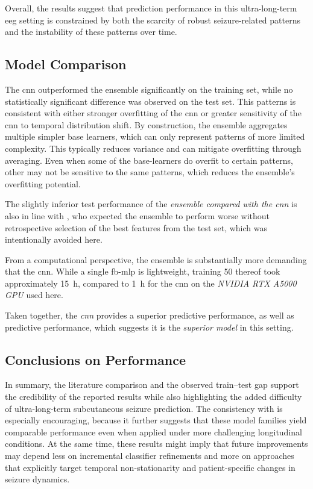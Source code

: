 Overall, the results suggest that prediction performance in this ultra-long-term \gls{eeg} setting is constrained by both the scarcity of robust seizure-related patterns and the instability of these patterns over time.

\subsection{Model Comparison}\label{subsec:discussion-model-comparison}
The \gls{cnn} outperformed the ensemble significantly on the training set, while no statistically significant difference was observed on the test set.
This patterns is consistent with either stronger overfitting of the \gls{cnn} or greater sensitivity of the \gls{cnn} to temporal distribution shift.
By construction, the ensemble aggregates multiple simpler base learners, which can only represent patterns of more limited complexity.
This typically reduces variance and can mitigate overfitting through averaging.
Even when some of the base-learners do overfit to certain patterns, other may not be sensitive to the same patterns, which reduces the ensemble's overfitting potential.

The slightly inferior test performance of the \textit{ensemble compared with the \gls{cnn}} is also in line with \textcite{eberlein_evaluation_2019, muller_coherent_2022}, who expected the ensemble to perform worse without retrospective selection of the best features from the test set, which was intentionally avoided here.

From a computational perspective, the ensemble is substantially more demanding that the \gls{cnn}.
While a single \gls{fb-mlp} is lightweight, training 50 thereof took approximately \SI{15}{\hour}, compared to \SI{1}{\hour} for the \gls{cnn} on the \textit{NVIDIA RTX A5000 GPU} used here.

Taken together, the \textit{\gls{cnn}} provides a superior predictive performance, as well as predictive performance, which suggests it is the \textit{superior model} in this setting.

\subsection{Conclusions on Performance}
In summary, the literature comparison and the observed train--test gap support the credibility of the reported results while also highlighting the added difficulty of ultra-long-term subcutaneous seizure prediction.
The consistency with \textcite{muller_coherent_2022} is especially encouraging, because it further suggests that these model families yield comparable performance even when applied under more challenging longitudinal conditions.
At the same time, these results might imply that future improvements may depend less on incremental classifier refinements and more on approaches that explicitly target temporal non-stationarity and patient-specific changes in seizure dynamics.


